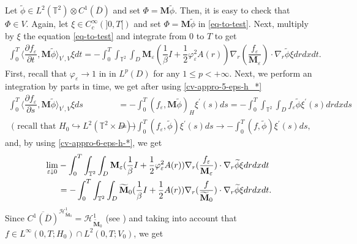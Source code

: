 \documentclass[a4paper,12pt, reqno]{amsart}
\newcommand{\T}{\mathbb{T}}
\newcommand{\Div}{\text{div}}
\begin{document}
       Let $\widetilde{\phi}\in L^2(\T^2)\otimes C^1(\overline{D})$ and set $\Phi=\mathbf{M}\widetilde{\phi}.$ Then, it is easy to check that $\Phi   \in V.$
    Again, let $\xi\in C^\infty_c(]0,T[)$ and 
    set $\Phi=\mathbf{M}\widetilde{\phi}$ in \eqref{eq-to-test}. Next,   multiply by $\xi$ the equation \eqref{eq-to-test} and integrate from $0$ to $T$ to get
    \begin{align*}
   \int_0^T \langle\dfrac{\partial f_\varepsilon}{\partial t},\mathbf{M}\widetilde{\phi}\rangle_{V^\prime,V} \xi dt=-\int_0^T\int_{\mathbb{T}^2}\int_D\mathbf{M}_\varepsilon (\dfrac{1}{\beta}I+\dfrac{1}{2}\varphi_\varepsilon^2A(r))\nabla_r(\dfrac{f_\varepsilon}{\mathbf{M}_\varepsilon})\cdot \nabla_r\widetilde{\phi} \xi drdx dt.
\end{align*}
First, recall that  $\varphi_\varepsilon \to 1$   in  in $L^p(D)$ for any $1\leq p<+\infty.$
Next, we perform an  integration by parts in time, we get after using \eqref{cv-appro-5-eps-h_*}
\begin{align*}
      \int_0^T \langle\dfrac{\partial f_\varepsilon}{\partial s},\mathbf{M}\widetilde{\phi}\rangle_{V^\prime,V} \xi ds&=- \int_0^T (f_\varepsilon,\mathbf{M}\widetilde{\phi})_{H}  \xi^\prime(s) ds=- \int_0^T  \int_{\mathbb{T}^2}\int_D  f_\varepsilon \widetilde{\phi}\xi^\prime(s) drdxds\\
\text{ ( recall that }  H_0\hookrightarrow L^2(\T^2\times D))   &= - \int_0^T (f_\varepsilon,\widetilde{\phi})  \xi^\prime(s) ds  \to  - \int_0^T (f,\widetilde{\phi})  \xi^\prime(s) ds,
\end{align*}
 and, by using   \eqref{cv-appro-6-eps-h-*}, we get
    \begin{align}
   \lim_{\varepsilon \downarrow 0}     &-\int_0^T\int_{\mathbb{T}^2}\int_D\mathbf{M}_\varepsilon (\dfrac{1}{\beta}I+\dfrac{1}{2}\varphi_\varepsilon^2A(r))\nabla_r(\dfrac{f_\varepsilon}{\mathbf{M}_\varepsilon})\cdot \nabla_r\widetilde{\phi} \xi drdx dt\notag\\
   &=-\int_0^T\int_{\mathbb{T}^2}\int_D\widetilde{\mathbf{M}}_0 (\dfrac{1}{\beta}I+\dfrac{1}{2}A(r))\nabla_r(\dfrac{f}{\widetilde{\mathbf{M}}_0})\cdot \nabla_r\widetilde{\phi} \xi drdx dt.\label{eq-regularity}
    \end{align}
   Since $    \overline{C^1(\overline{D})}^{\mathcal{H}^1_{\widetilde{\mathbf{M}}_0}}=\mathcal{H}^1_{\widetilde{\mathbf{M}}_0}$ (see \cite[Proposition B.2]{Masmoudi2013}) and taking into account that $f \in L^\infty(0, T;H_0)\cap   L^2(0, T;V_0)$, we get
\end{document}
